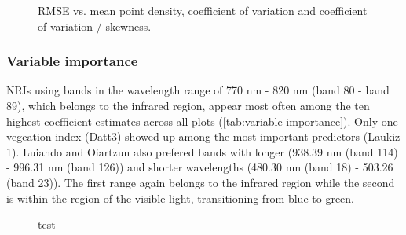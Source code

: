 \documentclass[review]{elsarticle}
\begin{document}
\begin{figure} [b!]
	\begin{center}
		\caption{RMSE vs. mean point density, coefficient of variation and coefficient of variation / skewness.}
		\label{fig:plot-characteristics}
	\end{center}
\end{figure}

\subsubsection{Variable importance}

\ac{NRI}s using bands in the wavelength range of 770 nm - 820 nm (band 80 - band 89), which belongs to the infrared region, appear most often among the ten highest coefficient estimates across all plots (\autoref{tab:variable-importance}).
Only one vegeation index (Datt3) showed up among the most important predictors (Laukiz 1).
Luiando and Oiartzun also prefered bands with longer (938.39 nm (band 114) - 996.31 nm (band 126)) and shorter wavelengths (480.30 nm (band 18) - 503.26 (band 23)).
The first range again belongs to the infrared region while the second is within the region of the visible light, transitioning from blue to green.


\begin{figure} [b!]
	\begin{center}
		\caption{test}
		\label{fig:important-bands}
	\end{center}
\end{figure}
\end{document}
